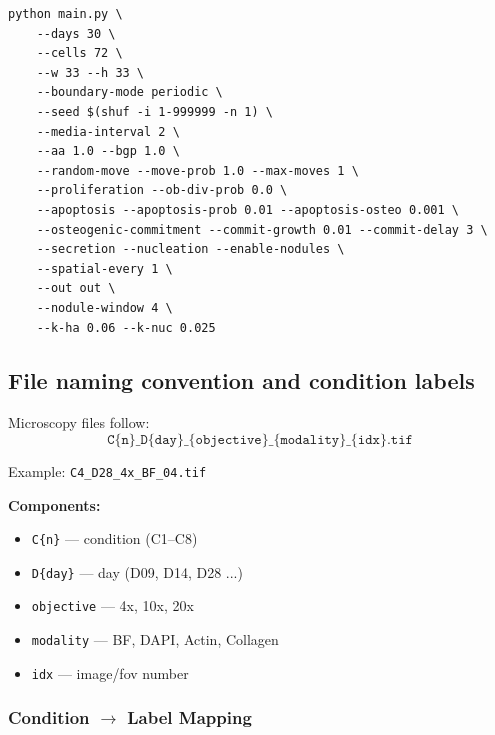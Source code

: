 \documentclass[11pt,a4paper]{article}
\begin{document}
\begin{center}
\begin{minipage}{0.95\linewidth}
\begin{verbatim}
python main.py \
    --days 30 \
    --cells 72 \
    --w 33 --h 33 \
    --boundary-mode periodic \
    --seed $(shuf -i 1-999999 -n 1) \
    --media-interval 2 \
    --aa 1.0 --bgp 1.0 \
    --random-move --move-prob 1.0 --max-moves 1 \
    --proliferation --ob-div-prob 0.0 \
    --apoptosis --apoptosis-prob 0.01 --apoptosis-osteo 0.001 \
    --osteogenic-commitment --commit-growth 0.01 --commit-delay 3 \
    --secretion --nucleation --enable-nodules \
    --spatial-every 1 \
    --out out \
    --nodule-window 4 \
    --k-ha 0.06 --k-nuc 0.025
\end{verbatim}
\end{minipage}
\end{center}

\newpage

\subsection{File naming convention and condition labels}

Microscopy files follow:
\[
\texttt{C\{n\}\_D\{day\}\_\{objective\}\_\{modality\}\_\{idx\}.tif}
\]

Example:
\texttt{C4\_D28\_4x\_BF\_04.tif}

\noindent\textbf{Components:}
\begin{itemize}
    \item \texttt{C\{n\}} — condition (C1--C8)
    \item \texttt{D\{day\}} — day (D09, D14, D28 ...)
    \item \texttt{objective} — 4x, 10x, 20x
    \item \texttt{modality} — BF, DAPI, Actin, Collagen
    \item \texttt{idx} — image/fov number
\end{itemize}

\subsubsection*{Condition $\rightarrow$ Label Mapping}
\end{document}
